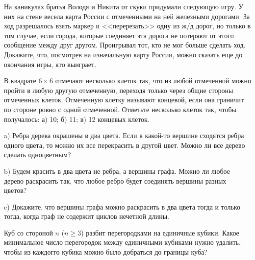 
\begin{exersize}
	На каникулах братья Володя и Никита от скуки придумали следующую игру. У них на стене весела карта России с отмеченными на ней железными дорогами. За ход разрешалось взять маркер и <<перерезать>> одну из ж/д дорог, но только в том случае, если города, которые соединяет эта дорога не потеряют от этого сообщение между друг другом. Проигрывал тот, кто не мог больше сделать ход. Докажите, что, посмотрев на изначальную карту России, можно сказать еще до окончания игры, кто выиграет.
\end{exersize}

\begin{exersize}
	В квадрате $6 \times 6$ отмечают несколько клеток так, что из любой отмеченной можно пройти в любую другую отмеченную, переходя только через общие стороны отмеченных клеток. Отмеченную клетку называют концевой, если она граничит по стороне ровно с одной отмеченной. Отметьте несколько клеток так, чтобы получалось: а) 10; б) 11; в) 12 концевых клеток.
\end{exersize}

\begin{exersize}
	a) Ребра дерева окрашены в два цвета. Если в какой-то вершине сходятся ребра одного цвета, то можно их все перекрасить в другой цвет. Можно ли все дерево сделать одноцветным?
	
	b) Будем красить в два цвета не ребра, а вершины графа. Можно ли любое дерево раскрасить так, что любое ребро будет соединять вершины разных цветов?
	
	c) Докажите, что вершины графа можно раскрасить в два цвета тогда и только тогда, когда граф не содержит циклов нечетной длины.
\end{exersize}	


\begin{exersize}
	Куб со стороной $n$ ($n \geqslant 3$) разбит перегородками на единичные кубики. Какое минимальное число перегородок между единичными кубиками нужно удалить, чтобы из каждогго кубика можно было добраться до границы куба?
\end{exersize}	

